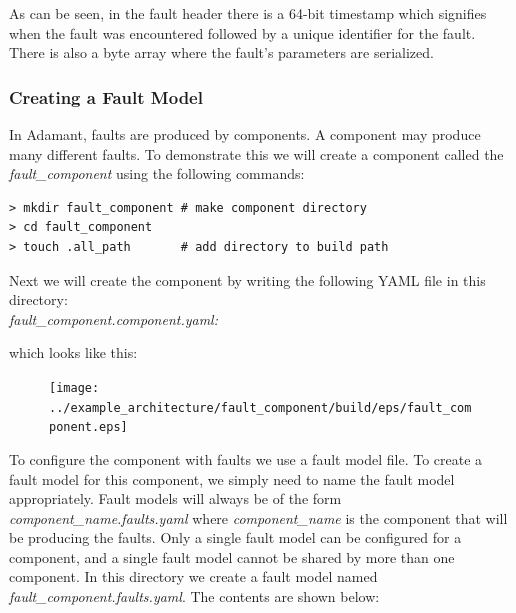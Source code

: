 


As can be seen, in the fault header there is a 64-bit timestamp which signifies when the fault was encountered followed by a unique identifier for the fault. There is also a byte array where the fault's parameters are serialized. \\

\subsubsection{Creating a Fault Model}

In Adamant, faults are produced by components. A component may produce many different faults. To demonstrate this we will create a component called the \textit{fault\_component} using the following commands:

\vspace{5mm} %
\begin{verbatim}
> mkdir fault_component # make component directory
> cd fault_component 
> touch .all_path       # add directory to build path
\end{verbatim}
\vspace{5mm} %

Next we will create the component by writing the following YAML file in this directory: \\

\textit{fault\_component.component.yaml:}

which looks like this:

\begin{figure}[H]
  \texttt{[image: ../example\_architecture/fault\_component/build/eps/fault\_component.eps]}
\end{figure}

To configure the component with faults we use a fault model file. To create a fault model for this component, we simply need to name the fault model appropriately. Fault models will always be of the form \textit{component\_name.faults.yaml} where \textit{component\_name} is the component that will be producing the faults. Only a single fault model can be configured for a component, and a single fault model cannot be shared by more than one component. In this directory we create a fault model named \textit{fault\_component.faults.yaml}. The contents are shown below: \\

